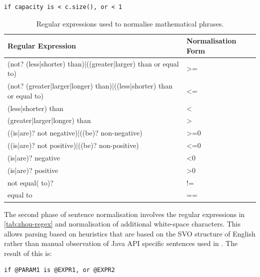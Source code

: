 \begin{verbatim}
if capacity is < c.size(), or < 1
\end{verbatim}

\begin{table}[]
	\begin{tabular}{|l|l|}
		\hline
		\textbf{Regular Expression} & \textbf{Normalisation Form} \\ \hline
		(not? (less|shorter) than)|((greater|larger) than or equal to) & \textgreater{}= \\ \hline
		(not? (greater|larger|longer) than)|((less|shorter) than or equal to) & \textless{}= \\ \hline
		(less|shorter) than & \textless{} \\ \hline
		(greater|larger|longer) than & \textgreater{} \\ \hline
		((is|are)? not negative)|((be)? non-negative) & \textgreater{}=0 \\ \hline
		((is|are)? not positive)|((be)? non-positive) & \textless{}=0 \\ \hline
		(is|are)? negative & \textless{}0 \\ \hline
		(is|are)? positive & \textgreater{}0 \\ \hline
		not equal( to)? & != \\ \hline
		equal to & == \\ \hline
	\end{tabular}
	\caption{Regular expressions used to normalise mathematical phrases.}
	\label{tab:normalisation-regex}
\end{table}

The second phase of sentence normalisation involves the regular expressions in \ref{tab:zhou-regex} and normalisation of additional white-space characters. This allows parsing based on heuristics that are based on the SVO structure of English rather than manual observation of Java API specific sentences used in \citeauthor{zhou-directive}. The result of this is:

\begin{verbatim}
if @PARAM1 is @EXPR1, or @EXPR2
\end{verbatim}

